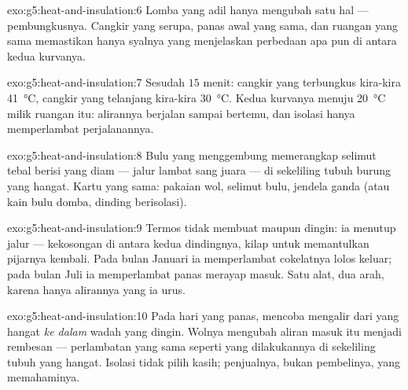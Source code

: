 \begin{solution}{exo:g5:heat-and-insulation:6}
Lomba yang adil hanya mengubah satu hal --- pembungkusnya. Cangkir
yang serupa, panas awal yang sama, dan ruangan yang sama memastikan
hanya syalnya yang menjelaskan perbedaan apa pun di antara kedua
kurvanya.
\end{solution}

\begin{solution}{exo:g5:heat-and-insulation:7}
Sesudah $15$ menit: cangkir yang terbungkus kira-kira
\qty{41}{\celsius}, cangkir yang telanjang kira-kira
\qty{30}{\celsius}. Kedua kurvanya menuju \qty{20}{\celsius} milik
ruangan itu: alirannya berjalan sampai  bertemu, dan isolasi
hanya memperlambat perjalanannya.
\end{solution}

\begin{solution}{exo:g5:heat-and-insulation:8}
Bulu yang menggembung memerangkap selimut tebal berisi  yang diam
--- jalur lambat sang juara --- di sekeliling tubuh burung yang
hangat. Kartu yang sama: pakaian wol, selimut bulu, jendela ganda
(atau kain bulu domba, dinding berisolasi).
\end{solution}

\begin{solution}{exo:g5:heat-and-insulation:9}
Termos tidak membuat  maupun dingin: ia menutup jalur  ---
kekosongan di antara kedua dindingnya, kilap untuk memantulkan
pijarnya kembali. Pada bulan Januari ia memperlambat  cokelatnya
lolos keluar; pada bulan Juli ia memperlambat   panas
merayap masuk. Satu alat, dua arah, karena hanya alirannya yang ia
urus.
\end{solution}

\begin{solution}{exo:g5:heat-and-insulation:10}
Pada hari yang panas,  mencoba mengalir dari  yang hangat
\emph{ke dalam} wadah yang dingin. Wolnya mengubah aliran masuk itu
menjadi rembesan --- perlambatan yang sama seperti yang dilakukannya
di sekeliling tubuh yang hangat. Isolasi tidak pilih kasih;
penjualnya, bukan pembelinya, yang memahaminya.
\end{solution}

